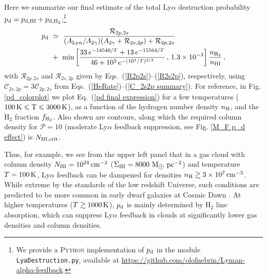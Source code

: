 \documentclass[fleqn,usenatbib]{mnras}
\newcommand\Msun{\text{M}_{\astrosun}} %
\newcommand\HI{\ion{H}{I}\xspace} %
\begin{document}
Here we summarize our final estimate of the total Ly$\alpha$ destruction probability $p_{\rm d} = p_{\rm d,HI} + p_{\rm d,H_2}$:\footnote{We provide a \textsc{Python} implementation of $p_{\rm d}$ in the module \texttt{LyaDestruction.py}, available at \url{https://github.com/olofnebrin/Lyman-alpha-feedback}.}
\begin{align}
    p_{\rm d} ~&\simeq~ \frac{\mathcal{R}_{2p,2s}}{(A_{\rm Ly \alpha}/A_{2 \gamma})( A_{2 \gamma} + \mathcal{R}_{2s,2p}) + \mathcal{R}_{2p,2s}} \label{pd final expression} \\ ~&+~ \min \left[ \dfrac{33 \, e^{-14540/T} + 13 \, e^{-15564/T}}{46 + 10^3 \, e^{-(10^3/T)^{3/2}}} \, , \, 1.3 \times 10^{-3} \right]  \dfrac{n_{\rm H_2}}{n_{\rm HI}} \nonumber \, ,
\end{align}
with $\mathcal{R}_{2p,2s}$ and $\mathcal{R}_{2s,2p}$ given by Eqs.~(\ref{R2p2s})--(\ref{R2s2p}), respectively, using $\mathcal{C}_{2s,2p} = 3\mathcal{C}_{2p,2s}$ from Eqs.~(\ref{HeRate})--(\ref{C_2s2p summary}). For reference, in Fig. \ref{pd_colorplot} we plot Eq.~(\ref{pd final expression}) for a few temperatures ($100\,\rm K \leq T \leq 3000\,\rm K$), as a function of the hydrogen number density $n_{\rm H}$, and the H$_2$ fraction $f_{\rm H_2}$. Also shown are contours, along which the required \HI column density for $\mathcal{P} = 10$ (moderate Ly$\alpha$ feedback suppression, see Fig. \ref{M_F p_d effect}) is $N_{\rm HI,crit}$.

Thus, for example, we see from the upper left panel that in a gas cloud with \HI column density $N_{\rm HI} = 10^{24} \, \rm cm^{-2}$ ($\Sigma_{\rm HI} = 8000 ~ \Msun \rm ~ pc^{-2}$) and temperature $T = 100 \, \rm K$, Ly$\alpha$ feedback can be dampened for densities $n_{\rm H} \gtrsim 3 \times 10^{7} \, \rm cm^{-3}$. While extreme by the standards of the low redshift Universe, such conditions are predicted to be more common in early dwarf galaxies at Cosmic Dawn \citep[e.g.][]{Kimm2016_GC, Nebrin2022}. At higher temperatures ($T \gtrsim 1000 \, \rm K$), $p_{\rm d}$ is mainly determined by H$_2$ line absorption, which can suppress Ly$\alpha$ feedback in clouds at significantly lower gas densities and \HI column densities.
\end{document}
